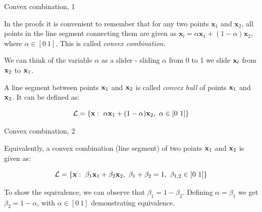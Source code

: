 \documentclass{beamer}
\begin{document}
\begin{frame}{Convex combination, 1}
	\begin{flushleft}
		
		
		In the proofs it is convenient to remember that for any two points $\mathbf{x}_1$ and $\mathbf{x}_2$, all points in the line segment connecting them are given as $\mathbf{x}_l = \alpha \mathbf{x}_1 + (1 - \alpha) \mathbf{x}_2$, where $\alpha \in [0 \ 1]$. This is called \emph{convex combination}.
		
		\bigskip
		
		We can think of the variable $\alpha$ as a slider - sliding $\alpha$ from 0 to 1 we slide $\mathbf{x}_l$ from $\mathbf{x}_2$ to $\mathbf{x}_1$.
		
		\bigskip
		
		A line segment between points $\mathbf{x}_1$ and $\mathbf{x}_2$ is called \emph{convex hull} of points $\mathbf{x}_1$ and $\mathbf{x}_2$. It can be defined as:
		
		\begin{equation}
			\mathcal{L} = \{  \mathbf{x}: \  \alpha \mathbf{x}_1 + (1 - \alpha) \mathbf{x}_2, \   \alpha \in [0 \ 1] \}
		\end{equation}
		
	\end{flushleft}
\end{frame}




\begin{frame}{Convex combination, 2}
	\begin{flushleft}
		
		
		Equivalently, a convex combination (line segment) of two points $\mathbf{x}_1$ and $\mathbf{x}_2$ is given as:
		
		\begin{equation}
			\mathcal{L} = \{  \mathbf{x}: \  \beta_1 \mathbf{x}_1 + \beta_2 \mathbf{x}_2, \ \beta_1+\beta_2 = 1, \   \beta_{1, 2} \in [0 \ 1] \}
		\end{equation}
		
		To show the equivalence, we can observe that $\beta_1 = 1 - \beta_2$. Defining $\alpha = \beta_1$ we get $\beta_2 = 1 - \alpha$, with $\alpha \in [0 \ 1]$ demonstrating equivalence.
		
		
		
	\end{flushleft}
\end{frame}
\end{document}
